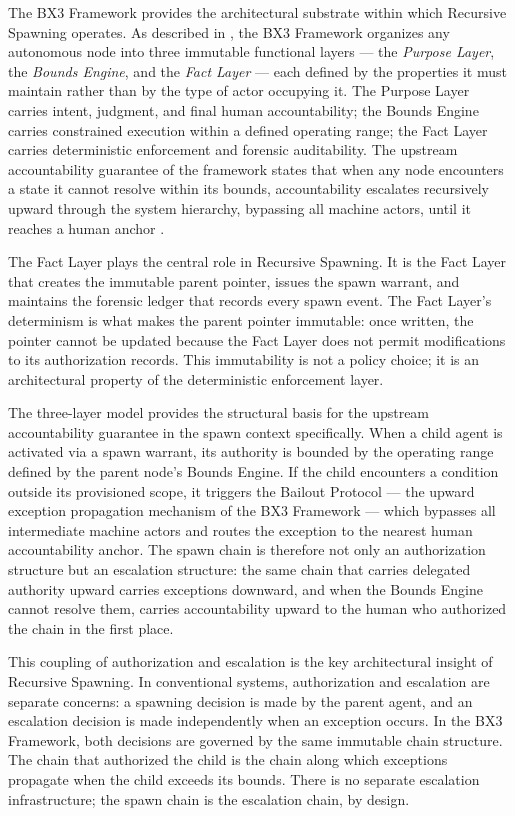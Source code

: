 The BX3 Framework provides the architectural substrate within which Recursive Spawning operates. As described in \cite{bx3framework2026}, the BX3 Framework organizes any autonomous node into three immutable functional layers --- the \textit{Purpose Layer}, the \textit{Bounds Engine}, and the \textit{Fact Layer} --- each defined by the properties it must maintain rather than by the type of actor occupying it. The Purpose Layer carries intent, judgment, and final human accountability; the Bounds Engine carries constrained execution within a defined operating range; the Fact Layer carries deterministic enforcement and forensic auditability. The upstream accountability guarantee of the framework states that when any node encounters a state it cannot resolve within its bounds, accountability escalates recursively upward through the system hierarchy, bypassing all machine actors, until it reaches a human anchor \cite{bx3framework2026}.

The Fact Layer plays the central role in Recursive Spawning. It is the Fact Layer that creates the immutable parent pointer, issues the spawn warrant, and maintains the forensic ledger that records every spawn event. The Fact Layer's determinism is what makes the parent pointer immutable: once written, the pointer cannot be updated because the Fact Layer does not permit modifications to its authorization records. This immutability is not a policy choice; it is an architectural property of the deterministic enforcement layer.

The three-layer model provides the structural basis for the upstream accountability guarantee in the spawn context specifically. When a child agent is activated via a spawn warrant, its authority is bounded by the operating range defined by the parent node's Bounds Engine. If the child encounters a condition outside its provisioned scope, it triggers the Bailout Protocol \cite{bailoutprotocol2026} --- the upward exception propagation mechanism of the BX3 Framework --- which bypasses all intermediate machine actors and routes the exception to the nearest human accountability anchor. The spawn chain is therefore not only an authorization structure but an escalation structure: the same chain that carries delegated authority upward carries exceptions downward, and when the Bounds Engine cannot resolve them, carries accountability upward to the human who authorized the chain in the first place.

This coupling of authorization and escalation is the key architectural insight of Recursive Spawning. In conventional systems, authorization and escalation are separate concerns: a spawning decision is made by the parent agent, and an escalation decision is made independently when an exception occurs. In the BX3 Framework, both decisions are governed by the same immutable chain structure. The chain that authorized the child is the chain along which exceptions propagate when the child exceeds its bounds. There is no separate escalation infrastructure; the spawn chain is the escalation chain, by design.

